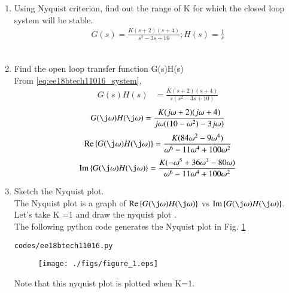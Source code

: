 \begin{enumerate}[label=\thesection.\arabic*.,ref=\thesection.\theenumi]
\item Using Nyquist criterion, find out the range of K for which the closed loop system will be stable.
\begin{align}
\label{eq:ee18btech11016_system}
 G(s)=\frac{K(s+2)(s+4)}{s^2-3s+10} ;  H(s) = \frac{1}{s}  
\end{align}
\\
\item Find the open loop transfer function G(s)H(s)
\\
\solution From \eqref{eq:ee18btech11016_system},
%
 \begin{align}
 \label{eq:ee18btech11016_system_equation}
G(s)H(s)&=\frac{K(s+2)(s+4)}{s(s^2-3s+10)}
 \end{align}
 \begin{align}
G(\j \omega)H(\j \omega)=\frac{K(j\omega+2)(j\omega+4)}{j\omega((10-\omega^2)-3j\omega)}
\end{align}
\begin{align}
 \text{Re} \cbrak{G(\j \omega)H(\j \omega)}=\frac{K(84\omega^2 - 9\omega^4)}{\omega^6-11\omega^4+100\omega^2} 
\end{align}
\begin{align}
 \text{Im} \cbrak{G(\j \omega)H(\j \omega)}=\frac{K(-\omega^5 + 36\omega^3-80\omega)}{\omega^6-11\omega^4+100\omega^2} 
\end{align}
%
\item Sketch the Nyquist plot.
\\
\solution The Nyquist plot is a graph of $\text{Re} \cbrak{G(\j \omega)H(\j \omega)}$  vs $\text{Im} \cbrak{G(\j \omega)H(\j \omega)}$.
Let's take K =1 and draw the nyquist plot . 
\\

The following python code generates the Nyquist plot in Fig.  \ref{fig:ee18btech11016}
\begin{lstlisting}
codes/ee18btech11016.py
\end{lstlisting}
%
\begin{figure}[!h]
  \centering
  \texttt{[image: ./figs/figure\_1.eps]}
  \caption{}
  \label{fig:ee18btech11016}
\end{figure}
%
Note that this nyquist plot is plotted when K=1.
\\
 

\end{enumerate}
